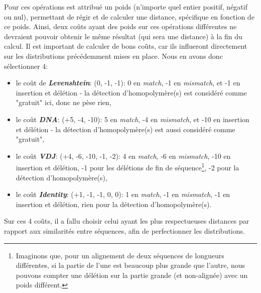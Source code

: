 \documentclass[pdftex,12pt,a4paper]{report}
\begin{document}
\begin{spacing}{1.2}
Pour ces opérations est attribué un poids (n'importe quel entier positif, négatif ou nul), permettant de régir et de calculer une distance, spécifique en fonction de ce poids.
\newline
Ainsi, deux coûts ayant des poids sur ces opérations différentes ne devraient pouvoir obtenir le même résultat (qui sera une distance) à la fin du calcul.
\newline
Il est important de calculer de bons coûts, car ils influeront directement sur les distributions précédemment mises en place. Nous en avons donc sélectionner 4:
\begin{itemize}
\item{le coût de \textbf{\textit{Levenshtein}}: (0, -1, -1): 0 en \textit{match}, -1 en \textit{mismatch}, et -1 en insertion et délétion - la détection d'homopolymère(s) est considéré comme "gratuit" ici, donc ne pèse rien,}
\item{le coût \textbf{\textit{DNA}}: (+5, -4, -10): 5 en \textit{match}, -4 en \textit{mismatch}, et -10 en insertion et délétion - la détection d'homopolymère(s) est aussi considéré comme "gratuit",}
\item{le coût \textbf{\textit{VDJ}}: (+4, -6, -10, -1, -2): 4 en \textit{match}, -6 en \textit{mismatch}, -10 en insertion et délétion, -1 pour les délétions de fin de séquence\footnote{Imaginons que, pour un alignement de deux séquences de longueurs différentes, si la partie de l'une est beaucoup plus grande que l'autre, nous pouvons compter une délétion sur la partie grande (et non-alignée) avec un poids différent.}, -2 pour la détection d'homopolymère(s),}
\item{le coût \textbf{\textit{Identity}}: (+1, -1, -1, 0, 0): 1 en \textit{match}, -1 en \textit{mismatch}, -1 en insertion et délétion, rien pour la détection d'homopolymère(s).}
\end{itemize}
Sur ces 4 coûts, il a fallu choisir celui ayant les plus respectueuses distances par rapport aux similarités entre séquences, afin de perfectionner les distributions.


\end{spacing}
\end{document}
